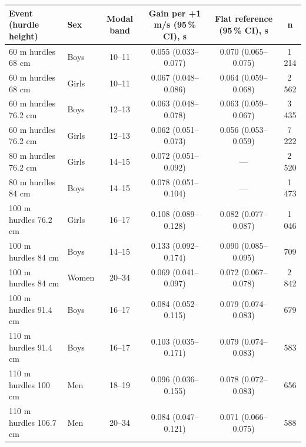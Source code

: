 \begin{tabular}{llcccc}
\toprule
Event (hurdle height) & Sex & Modal band & Gain per +1 m/s (95\,\% CI), s & Flat reference (95\,\% CI), s & n \\
\midrule
60 m hurdles 68 cm & Boys & 10--11 & 0.055 (0.033--0.077) & 0.070 (0.065--0.075) & 1\,214 \\
60 m hurdles 68 cm & Girls & 10--11 & 0.067 (0.048--0.086) & 0.064 (0.059--0.068) & 2\,562 \\
60 m hurdles 76.2 cm & Boys & 12--13 & 0.063 (0.048--0.078) & 0.063 (0.059--0.067) & 3\,435 \\
60 m hurdles 76.2 cm & Girls & 12--13 & 0.062 (0.051--0.073) & 0.056 (0.053--0.059) & 7\,222 \\
80 m hurdles 76.2 cm & Girls & 14--15 & 0.072 (0.051--0.092) & --- & 2\,520 \\
80 m hurdles 84 cm & Boys & 14--15 & 0.078 (0.051--0.104) & --- & 1\,473 \\
100 m hurdles 76.2 cm & Girls & 16--17 & 0.108 (0.089--0.128) & 0.082 (0.077--0.087) & 1\,046 \\
100 m hurdles 84 cm & Boys & 14--15 & 0.133 (0.092--0.174) & 0.090 (0.085--0.095) & 709 \\
100 m hurdles 84 cm & Women & 20--34 & 0.069 (0.041--0.097) & 0.072 (0.067--0.078) & 2\,842 \\
100 m hurdles 91.4 cm & Boys & 16--17 & 0.084 (0.052--0.115) & 0.079 (0.074--0.083) & 679 \\
110 m hurdles 91.4 cm & Boys & 16--17 & 0.103 (0.035--0.171) & 0.079 (0.074--0.083) & 583 \\
110 m hurdles 100 cm & Men & 18--19 & 0.096 (0.036--0.155) & 0.078 (0.072--0.083) & 656 \\
110 m hurdles 106.7 cm & Men & 20--34 & 0.084 (0.047--0.121) & 0.071 (0.066--0.075) & 588 \\
\bottomrule
\end{tabular}
